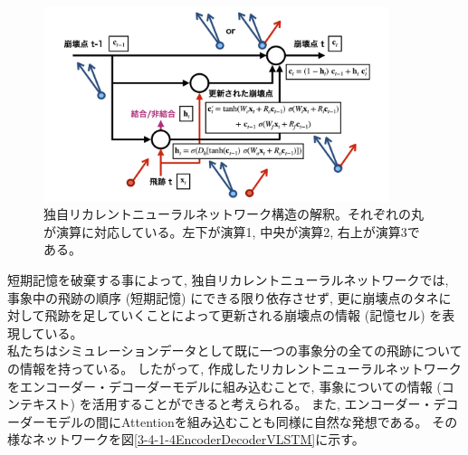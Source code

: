 \begin{figure}[htbp]
 \centering
 \includegraphics[width=0.9\textwidth, clip]{Figure/3Networks/3-4-1-3Interpretation.png}
 \caption[独自リカレントニューラルネットワーク構造の解釈]{独自リカレントニューラルネットワーク構造の解釈。それぞれの丸が演算に対応している。左下が演算1, 中央が演算2, 右上が演算3である。}
 \label{3-4-1-3Interpretation}
\end{figure}

短期記憶を破棄する事によって, 独自リカレントニューラルネットワークでは, 事象中の飛跡の順序 (短期記憶) にできる限り依存させず, 更に崩壊点のタネに対して飛跡を足していくことによって更新される崩壊点の情報 (記憶セル) を表現している。\\

私たちはシミュレーションデータとして既に一つの事象分の全ての飛跡についての情報を持っている。
したがって, 作成したリカレントニューラルネットワークをエンコーダー・デコーダーモデルに組み込むことで, 事象についての情報 (コンテキスト) を活用することができると考えられる。
また, エンコーダー・デコーダーモデルの間にAttentionを組み込むことも同様に自然な発想である。
その様なネットワークを図\ref{3-4-1-4EncoderDecoderVLSTM}に示す。

